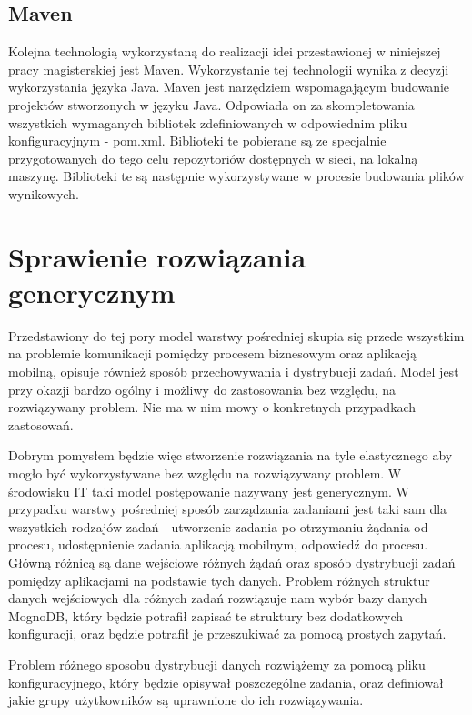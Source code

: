 \subsection{Maven}
Kolejna technologią wykorzystaną do realizacji idei przestawionej w niniejszej pracy magisterskiej jest Maven. Wykorzystanie tej technologii wynika z decyzji wykorzystania języka Java. Maven jest narzędziem wspomagającym budowanie projektów stworzonych w języku Java. Odpowiada on za skompletowania wszystkich wymaganych bibliotek zdefiniowanych w odpowiednim pliku konfiguracyjnym - pom.xml. Biblioteki te pobierane są ze specjalnie przygotowanych do tego celu repozytoriów dostępnych w sieci, na lokalną maszynę. Biblioteki te są następnie wykorzystywane w procesie budowania plików wynikowych.  


\section{Sprawienie rozwiązania generycznym}
\label{sec:generic}

Przedstawiony do tej pory model warstwy pośredniej skupia się przede wszystkim na problemie komunikacji pomiędzy procesem biznesowym oraz aplikacją mobilną, opisuje również sposób przechowywania i dystrybucji zadań. Model jest przy okazji bardzo ogólny i możliwy do zastosowania bez względu, na rozwiązywany problem. Nie ma w nim mowy o konkretnych przypadkach zastosowań. 

Dobrym pomysłem będzie więc stworzenie rozwiązania na tyle elastycznego aby mogło być wykorzystywane bez względu na rozwiązywany problem. W środowisku IT taki model postępowanie nazywany jest generycznym. W przypadku warstwy pośredniej sposób zarządzania zadaniami jest taki sam dla wszystkich rodzajów zadań - utworzenie zadania po otrzymaniu żądania od procesu, udostępnienie zadania aplikacją mobilnym, odpowiedź do procesu. Główną różnicą są dane wejściowe różnych żądań oraz sposób dystrybucji zadań pomiędzy aplikacjami na podstawie tych danych. Problem różnych struktur danych wejściowych dla różnych zadań rozwiązuje nam wybór bazy danych MognoDB, który będzie potrafił zapisać te struktury bez dodatkowych konfiguracji, oraz będzie potrafił je przeszukiwać za pomocą prostych zapytań. 

Problem różnego sposobu dystrybucji danych rozwiążemy za pomocą pliku konfiguracyjnego, który będzie opisywał poszczególne zadania, oraz definiował jakie grupy użytkowników są uprawnione do ich rozwiązywania.

